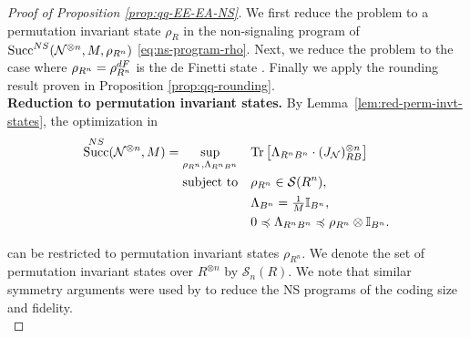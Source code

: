 \documentclass[a4paper,onecolumn,11pt,accepted=2025-10-01]{quantumarticle}
\DeclareMathOperator{\suc}{Succ}
\newcommand*{\cN}{\mathcal{N}}
\newcommand*{\cS}{\mathcal{S}}
\newcommand*{\tr}[1]{\mathrm{Tr}\left[#1\right]}
\newcommand*{\mle}{\preccurlyeq}
\begin{document}
\begin{proof}[Proof of Proposition \ref{prop:qq-EE-EA-NS}] We first  reduce the problem to a permutation invariant state $\rho_R$ in the non-signaling program of $\suc^{\rm{NS}}(\cN^{\otimes n},M, \rho_{R^n})$ \eqref{eq:ns-program-rho}. Next,  we reduce the problem to the case where $\rho_{R^n} = \rho_{R^n}^{\rm{dF}}$ is the de Finetti state \cite{christandl2009postselection}. Finally we apply the rounding result proven in Proposition \ref{prop:qq-rounding}.\\

\textbf{Reduction to permutation invariant states.} 
By Lemma~\ref{lem:red-perm-invt-states}, the optimization in 
\begin{align}
    \suc^{\rm{NS}}(\cN^{\otimes n}, M) = \sup_{\rho_{R^n}, \Lambda_{R^n B^n}} \quad & \tr{\Lambda_{R^n B^n} \cdot (J_{\cN})_{RB}^{\otimes n}} \\
    \text{subject to} \quad
    & \rho_{R^n} \in \cS(R^n), \\
    & \Lambda_{B^n} = \tfrac{1}{M} \mathbb{I}_{B^n}, \\
    & 0 \mle \Lambda_{R^n B^n} \mle \rho_{R^n} \otimes \mathbb{I}_{B^n}.
\end{align}


can be restricted to permutation invariant states $\rho_{R^n}$.  We denote the set of permutation invariant states over $R^{\otimes n}$ by $\cS_n(R)$. We note that similar symmetry arguments were used by \cite{Matthews2014Sep,Leung2015Jun} to reduce the NS programs of the coding size and fidelity.\\


\end{proof}
\end{document}

